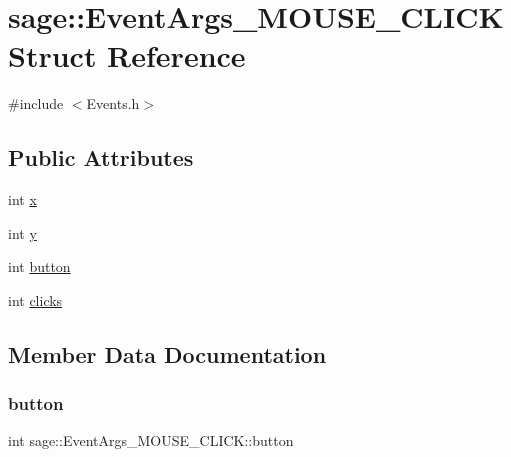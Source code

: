 \hypertarget{structsage_1_1EventArgs__MOUSE__CLICK}{}\section{sage\+::Event\+Args\+\_\+\+M\+O\+U\+S\+E\+\_\+\+C\+L\+I\+CK Struct Reference}
\label{structsage_1_1EventArgs__MOUSE__CLICK}


{\ttfamily \#include $<$Events.\+h$>$}

\subsection*{Public Attributes}
\begin{DoxyCompactItemize}
\item 
int \mbox{\hyperlink{structsage_1_1EventArgs__MOUSE__CLICK_a8181ddab316ffee1746237d6a496c1e5}{x}}
\item 
int \mbox{\hyperlink{structsage_1_1EventArgs__MOUSE__CLICK_a77476820a4ddd808f1a77a98146f74e6}{y}}
\item 
int \mbox{\hyperlink{structsage_1_1EventArgs__MOUSE__CLICK_acf42468819dafeb719408248162ead11}{button}}
\item 
int \mbox{\hyperlink{structsage_1_1EventArgs__MOUSE__CLICK_ac606f385fa8f8e2fec66225099f9744e}{clicks}}
\end{DoxyCompactItemize}


\subsection{Member Data Documentation}
\mbox{\label{structsage_1_1EventArgs__MOUSE__CLICK_acf42468819dafeb719408248162ead11}} 
\subsubsection{\texorpdfstring{button}{button}}
{\footnotesize\ttfamily int sage\+::\+Event\+Args\+\_\+\+M\+O\+U\+S\+E\+\_\+\+C\+L\+I\+C\+K\+::button}

\mbox{\label{structsage_1_1EventArgs__MOUSE__CLICK_ac606f385fa8f8e2fec66225099f9744e}} 
